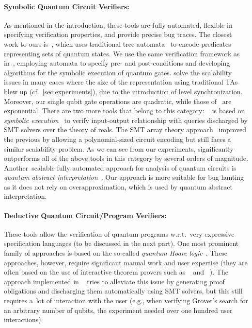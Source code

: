 \paragraph{Symbolic Quantum Circuit Verifiers:}
As mentioned in the introduction, these tools are fully automated, flexible in specifying verification properties, and provide precise bug traces. 
The closest work to ours is~\cite{ChenCLLTY23,ChenCLLT23}, which uses
traditional tree automata~\cite{tata} to encode predicates representing sets of quantum states.
We use the same verification framework as in~\cite{ChenCLLTY23,ChenCLLT23}, employing automata to specify pre- and post-conditions and developing algorithms for the symbolic execution of quantum gates.
\lstas solve the scalability issues in many cases where the size of the
representation using traditional TAs blew up (cf.~\cref{sec:experiments}), due to the
introduction of level synchronization.
Moreover, our single qubit gate operations are quadratic, while those
of~\cite{ChenCLLTY23,ChenCLLT23} are exponential. 
There are two more tools that belong to this category:
\symqv~\cite{BauerMarquartLS23} is based on \emph{symbolic
execution}~\cite{King76} to verify input-output relationship with queries
discharged by SMT solvers over the theory of reals.
The SMT array theory approach~\cite{chen2023theory} improved the 
previous by allowing a polynomial-sized circuit encoding but still faces a
similar scalability problem.
As we can see from our experiments, \tool significantly outperforms all of the
above tools in this category by several orders of magnitude.
Another~scalable fully automated approach for analysis of quantum circuits is \emph{quantum abstract interpretation}~\cite{yu2021quantum,perdrix2008quantum}.
Our approach is more suitable for bug hunting as it does not rely on 
overapproximation, which is used by quantum abstract interpretation. 

\paragraph{Deductive Quantum Circuit/Program Verifiers:}
These tools allow the verification of quantum programs
w.r.t.\ very expressive specification languages (to be discussed in the next part). One most prominent family of approaches is based on the so-called \emph{quantum Hoare
logic}~\cite{zhou2019applied,unruh2019quantum,feng2021quantum,ying2012floyd,liu2019formal}.
These approaches, however, require significant manual work and user expertise
(they are often based on the use of interactive theorem provers such as
\isabelle~\cite{nipkow2002isabelle} and \coq~\cite{bertot2013interactive}). The approach implemented in \qbricks~\cite{Chareton2021} tries to alleviate this
issue by generating proof obligations and discharging them automatically using
SMT solvers, but this still requires a~lot of interaction with the user (e.g.,
when verifying Grover's search for an arbitrary number of qubits, the experiment
needed over one hundred user interactions).

